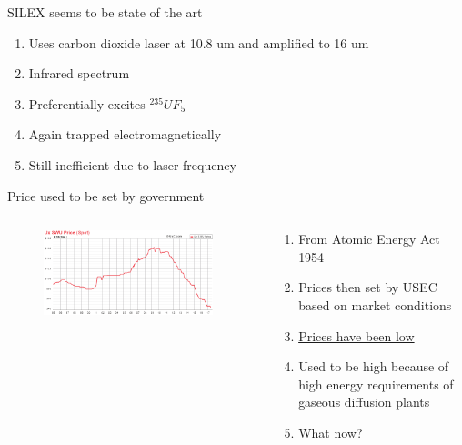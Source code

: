 \documentclass[aspectratio=1610,pdftex,dvipsnames,compress,xcolor={dvipsnames}]{beamer}
\begin{document}
\begin{frame}{SILEX seems to be state of the art}
    \begin{enumerate}[topsep=0pt,itemsep=21pt,leftmargin=*,label=(\arabic*)]
        \item[]Uses carbon dioxide laser at 10.8 um and amplified to 16 um
        \item[]Infrared spectrum
        \item[]Preferentially excites $^{235}UF_5$
        \item[]Again trapped electromagnetically
        \item[]Still inefficient due to laser frequency
    \end{enumerate}
\end{frame}


\begin{frame}{Price used to be set by government}
    \begin{columns}[t]

        \begin{column}{0.55\textwidth}
            \begin{figure}
                \centering
                \includegraphics[width=0.95\textwidth]{swu.png}
            \end{figure}
        \end{column}

        \begin{column}{0.45\textwidth}
            \begin{enumerate}[series=outerlist,topsep=0pt,itemsep=11pt,leftmargin=*,label=(\arabic*)]
                \item[]From Atomic Energy Act 1954
                \item[]Prices then set by USEC based on market conditions
                \item[]\href{https://www.neimagazine.com/opinion/opinionuranium-enrichment-why-are-prices-now-much-lower-and-what-is-the-impact-5692128/}{Prices have been low}
                \item[]Used to be high because of high energy requirements of gaseous diffusion plants
                \item[]What now?
            \end{enumerate}
        \end{column}

    \end{columns}
\end{frame}
\end{document}
